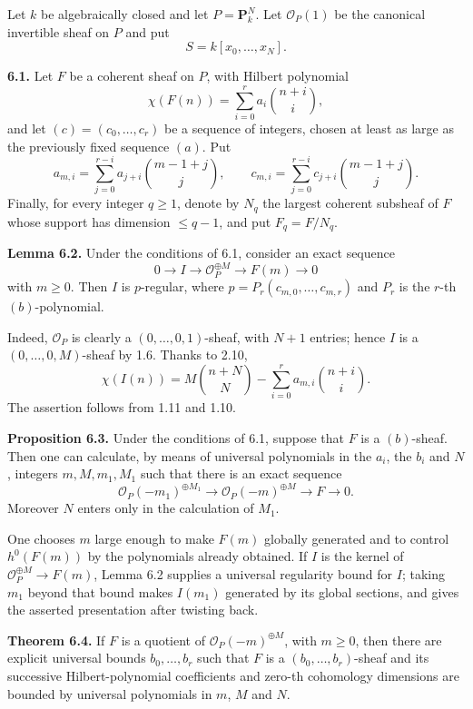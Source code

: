 \documentclass[11pt]{article}
\begin{document}
Let $k$ be algebraically closed and let $P=\mathbf P^N_k$. Let $\mathcal O_P(1)$ be the canonical invertible sheaf on $P$ and put
\[
   S=k[x_0,\ldots,x_N].
\]

\textbf{6.1.} Let $F$ be a coherent sheaf on $P$, with Hilbert polynomial
\[
   \chi(F(n))=\sum_{i=0}^{r} a_i {n+i\choose i},
\]
and let $(c)=(c_0,\ldots,c_r)$ be a sequence of integers, chosen at least as large as the previously fixed sequence $(a)$. Put
\[
   a_{m,i}=\sum_{j=0}^{r-i}a_{j+i}{m-1+j\choose j},
   \qquad
   c_{m,i}=\sum_{j=0}^{r-i}c_{j+i}{m-1+j\choose j}.
\]
Finally, for every integer $q\ge1$, denote by $N_q$ the largest coherent subsheaf of $F$ whose support has dimension $\le q-1$, and put $F_q=F/N_q$.

\textbf{Lemma 6.2.} Under the conditions of 6.1, consider an exact sequence
\[
   0\longrightarrow I\longrightarrow \mathcal O_P^{\oplus M}\longrightarrow F(m)\longrightarrow0
\]
with $m\ge0$. Then $I$ is $p$-regular, where $p=P_r(c_{m,0},\ldots,c_{m,r})$ and $P_r$ is the $r$-th $(b)$-polynomial.

Indeed, $\mathcal O_P$ is clearly a $(0,\ldots,0,1)$-sheaf, with $N+1$ entries; hence $I$ is a $(0,\ldots,0,M)$-sheaf by 1.6. Thanks to 2.10,
\[
   \chi(I(n))=M{n+N\choose N}-\sum_{i=0}^{r} a_{m,i}{n+i\choose i}.
\]
The assertion follows from 1.11 and 1.10.

\textbf{Proposition 6.3.} Under the conditions of 6.1, suppose that $F$ is a $(b)$-sheaf. Then one can calculate, by means of universal polynomials in the $a_i$, the $b_i$ and $N$, integers $m,M,m_1,M_1$ such that there is an exact sequence
\[
   \mathcal O_P(-m_1)^{\oplus M_1}\longrightarrow \mathcal O_P(-m)^{\oplus M}\longrightarrow F\longrightarrow0.
\]
Moreover $N$ enters only in the calculation of $M_1$.

One chooses $m$ large enough to make $F(m)$ globally generated and to control $h^0(F(m))$ by the polynomials already obtained. If $I$ is the kernel of $\mathcal O_P^{\oplus M}\to F(m)$, Lemma 6.2 supplies a universal regularity bound for $I$; taking $m_1$ beyond that bound makes $I(m_1)$ generated by its global sections, and gives the asserted presentation after twisting back.

\textbf{Theorem 6.4.} If $F$ is a quotient of $\mathcal O_P(-m)^{\oplus M}$, with $m\ge0$, then there are explicit universal bounds $b_0,\ldots,b_r$ such that $F$ is a $(b_0,\ldots,b_r)$-sheaf and its successive Hilbert-polynomial coefficients and zero-th cohomology dimensions are bounded by universal polynomials in $m$, $M$ and $N$.
\end{document}

